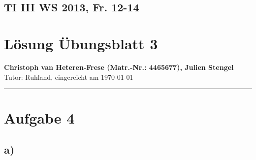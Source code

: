\documentclass[11pt, a4paper]{scrartcl}
\begin{document}
\lstset{basicstyle=\small,
		 inputencoding=latin1,
		stringstyle=\ttfamily,
		identifierstyle=,
		showstringspaces=false,
		language=c,
		frame=trBL}
%
\subsection*{TI III WS 2013, Fr. 12-14}
\section*{Lösung Übungsblatt 3}
\textbf{Christoph van Heteren-Frese (Matr.-Nr.: 4465677), Julien  Stengel } \\%
Tutor: Ruhland, eingereicht am \today\\
\hrule
%
\section*{Aufgabe 4}
\subsection*{a)}
\end{document}
